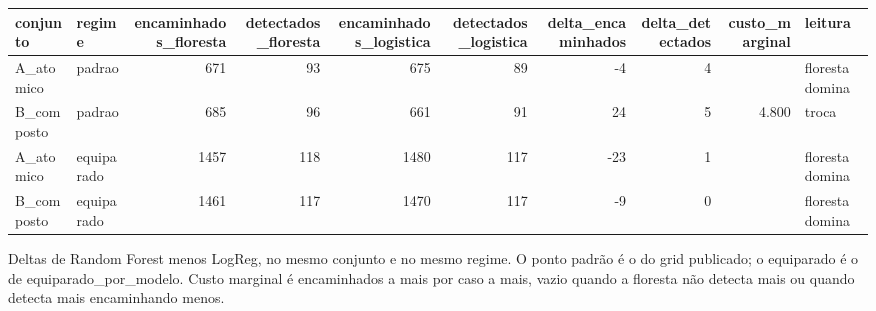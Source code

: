 \begin{tabular}{llrrrrrrrl}
\toprule
conjunto & regime & encaminhados_floresta & detectados_floresta & encaminhados_logistica & detectados_logistica & delta_encaminhados & delta_detectados & custo_marginal & leitura \\
\midrule
A_atomico & padrao & 671 & 93 & 675 & 89 & -4 & 4 &  & floresta domina \\
B_composto & padrao & 685 & 96 & 661 & 91 & 24 & 5 & 4.800 & troca \\
A_atomico & equiparado & 1457 & 118 & 1480 & 117 & -23 & 1 &  & floresta domina \\
B_composto & equiparado & 1461 & 117 & 1470 & 117 & -9 & 0 &  & floresta domina \\
\bottomrule
\end{tabular}

\begin{flushleft}
\footnotesize Deltas de Random Forest menos LogReg, no mesmo conjunto e no mesmo regime. O ponto padrão é o do grid publicado; o equiparado é o de equiparado_por_modelo. Custo marginal é encaminhados a mais por caso a mais, vazio quando a floresta não detecta mais ou quando detecta mais encaminhando menos.
\end{flushleft}

